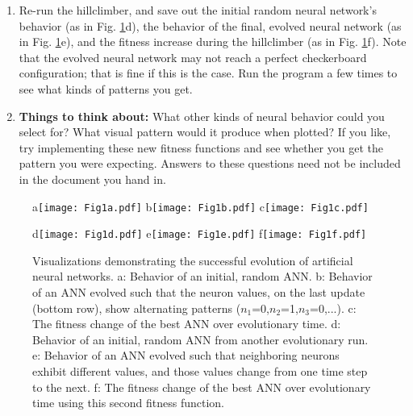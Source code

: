\documentclass[12pt]{article}
\begin{document}
\begin{enumerate}
\item Re-run the hillclimber, and save out the initial random neural network's behavior (as in Fig. \ref{Fig}d), the behavior of the final, evolved neural network (as in Fig. \ref{Fig}e), and the fitness increase during the hillclimber (as in Fig. \ref{Fig}f). Note that the evolved neural network may not reach a perfect checkerboard configuration; that is fine if this is the case. Run the program a few times to see what kinds of patterns you get.

\item \textbf{Things to think about:} What other kinds of neural behavior could you select for? What visual pattern would it produce when plotted? If you like, try implementing these new fitness functions and see whether you get the pattern you were expecting. Answers to these questions need not be included in the document you hand in.

\end{enumerate}

\begin{figure}[!t]
\centerline{
a\texttt{[image: Fig1a.pdf]}
b\texttt{[image: Fig1b.pdf]}
c\texttt{[image: Fig1c.pdf]}
}
\centerline{
d\texttt{[image: Fig1d.pdf]}
e\texttt{[image: Fig1e.pdf]}
f\texttt{[image: Fig1f.pdf]}
}
\caption{Visualizations demonstrating the successful evolution of artificial neural networks.
a: Behavior of an initial, random ANN.
b: Behavior of an ANN evolved such that the neuron values, on the last update (bottom row), show alternating patterns ($n_1$=0,$n_2$=1,$n_3$=0,...).
c: The fitness change of the best ANN over evolutionary time.
d: Behavior of an initial, random ANN from another evolutionary run.
e: Behavior of an ANN evolved such that neighboring neurons exhibit different values, and those values change from one time step to the next.
f: The fitness change of the best ANN over evolutionary time using this second fitness function.
}
\label{Fig}
\end{figure}
\end{document}
